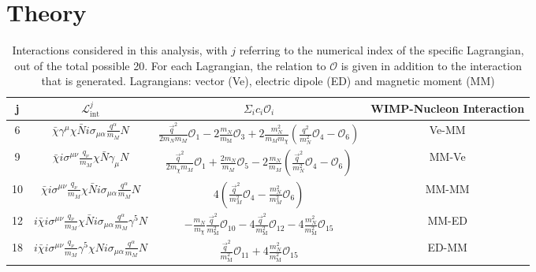 \documentclass[reprint, showpacs,
preprintnumbers,
amsmath,amssymb,
aps, floatfix,
superscriptaddress,
prd, nofootinbib]{revtex4-1}
\begin{document}
\section{\label{sec:theory}Theory}
\begin{table}
    \centering
    \begin{ruledtabular}
        \begin{tabular}{cccc}       
            j & $\mathcal{L}_\mathrm{int}^j$ & $\Sigma_i c_i\mathcal{O}_i$ & WIMP-Nucleon Interaction \\ \hline
                    6 & $\bar{\chi} \gamma^{\mu} \chi \bar{N} i \sigma_{\mu \alpha} \frac{q^\alpha}{m_M} N $ & $\frac{\vec{q}^2}{2 m_N m_M} \mathcal{O}_1-2 \frac{m_N}{m_{\mathrm{M}}} \mathcal{O}_3 +  2 \frac{m_N^2}{m_M{m_\chi}}\left(\frac{q^2}{m_N^2} \mathcal{O}_4-\mathcal{O}_6\right) $ &Ve-MM\\
            9 & $\bar{\chi} i \sigma^{\mu \nu} \frac{q_\nu}{m_M} \chi \bar{N} \gamma_\mu N$ & $\frac{\vec{q}^2}{2m_\chi m_M}\mathcal{O}_1 + \frac{2m_N}{m_M}\mathcal{O}_5 - 2\frac{m_N}{m_M}(\frac{\vec{q}^2}{m^2_N}\mathcal{O}_4 - \mathcal{O}_6)$ & MM-Ve \\
            10 & $\bar{\chi} i \sigma^{\mu \nu} \frac{q_\nu}{m_M} \chi \bar{N} i \sigma_{\mu \alpha} \frac{q^\alpha}{m_M} N$ & $4(\frac{\vec{q}^2}{m^2_M}\mathcal{O}_4 - \frac{m^2_N}{m^2_M}\mathcal{O}_6)$ & MM-MM \\
            12 & $i\bar{\chi} i \sigma^{\mu \nu} \frac{q_\nu}{m_M} \chi \bar{N} i \sigma_{\mu \alpha} \frac{q^\alpha}{m_M} \gamma^{5} N$  &$-\frac{m_N}{m_\chi} \frac{\vec{q}^2}{m_{\mathrm{M}}^2} \mathcal{O}_{10}-4 \frac{\vec{q}^2}{m_{\mathrm{M}}^2} \mathcal{O}_{12}-4 \frac{m_N^2}{m_{\mathrm{M}}^2} \mathcal{O}_{15}$ & MM-ED \\
            18 & $i \bar{\chi} i \sigma^{\mu \nu} \frac{q_\nu}{m_M} \gamma^5 \chi N i \sigma_{\mu \alpha} \frac{q^\alpha}{m_M} N $ & $\frac{\vec{q}^2}{m_{\mathrm{M}}^2} \mathcal{O}_{11}+4 \frac{m_N^2}{m_{\mathrm{M}}^2} \mathcal{O}_{15}$  & ED-MM \\
        \end{tabular}        
    \end{ruledtabular}
    \caption{Interactions considered in this analysis, with $j$ referring to the numerical index of the specific Lagrangian, out of the total possible 20. 
    For each Lagrangian, the relation to $\mathcal{O}$ is given in addition to the interaction that is generated.
    Lagrangians: vector (Ve), electric dipole (ED) and magnetic moment (MM)}
    \label{tab:nr_eft_lagrangians2}
\end{table}
\end{document}
